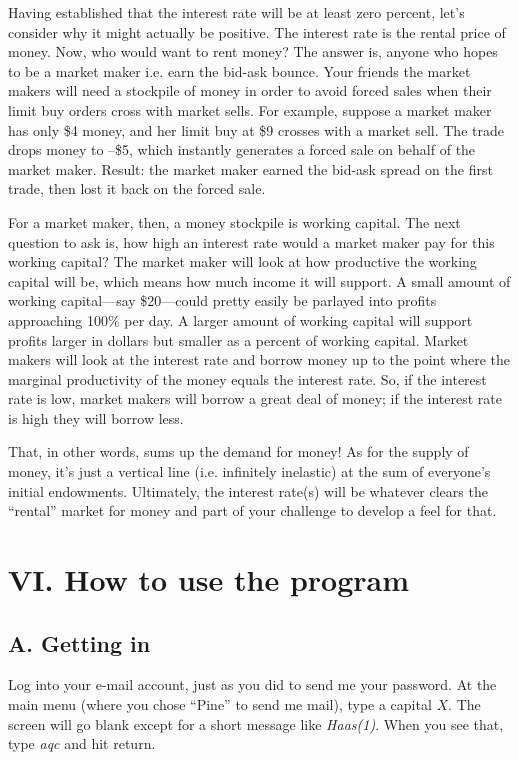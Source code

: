 Having established that the interest rate will be at least zero
percent, let's consider why it might actually be positive.  The
interest rate is the rental price of money.  Now, who would want to
rent money?  The answer is, anyone who hopes to be a market maker
i.e. earn the bid-ask bounce.  Your friends the market makers will
need a stockpile of money in order to avoid forced sales when their
limit buy orders cross with market sells.  For example, suppose a
market maker has only \$4 money, and her limit buy at \$9 crosses with
a market sell.  The trade drops money to --\$5, which instantly
generates a forced sale on behalf of the market maker.  Result: the
market maker earned the bid-ask spread on the first trade, then lost
it back on the forced sale.%

For a market maker, then, a money stockpile is working capital.  The
next question to ask is, how high an interest rate would a market
maker pay for this working capital?  The market maker will look at
how productive the working capital will be, which means how much
income it will support.  A small amount of working capital---say
\$20---could pretty easily be parlayed into profits approaching 100\%
per day.  A larger amount of working capital will support profits
larger in dollars but smaller as a percent of working capital.
Market makers will look at the interest rate and borrow money up to
the point where the marginal productivity of the money equals the
interest rate.  So, if the interest rate is low, market makers will
borrow a great deal of money; if the interest rate is high they will
borrow less.

That, in other words, sums up the demand for money!  As for the
supply of money, it's just a vertical line (i.e. infinitely
inelastic) at the sum of everyone's initial endowments.  Ultimately,
the interest rate(s) will be whatever clears the ``rental'' market
for money and part of your challenge to develop a feel for that.

\section{VI. How to use the program}%
\subsection{A. Getting in}%
Log into your e-mail account, just as you did to send me your
password.  At the main menu (where you chose ``Pine'' to send me
mail), type a capital $X$.  The screen will go blank except for a
short message like {\it Haas(1)}.  When you see that, type {\it aqc}
and hit return.

